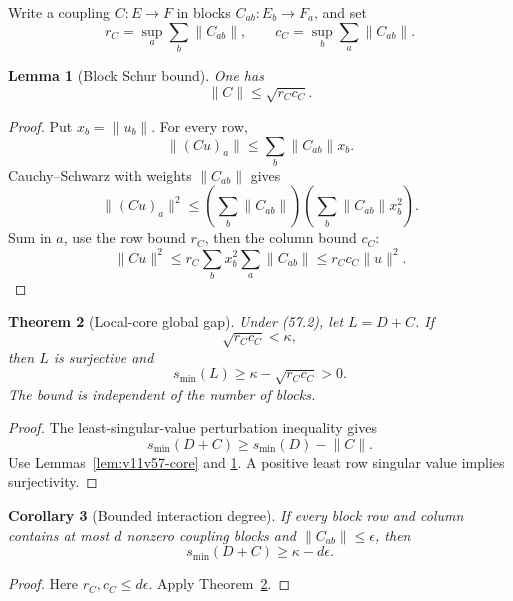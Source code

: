 \documentclass[11pt]{article}
\newtheorem{theorem}{Theorem}[section]
\newtheorem{lemma}[theorem]{Lemma}
\newtheorem{corollary}[theorem]{Corollary}
\begin{document}
Write a coupling \(C:E\to F\) in blocks \(C_{ab}:E_b\to F_a\), and set
\[
 r_C=\sup_a\sum_b\lVert C_{ab}\rVert,\qquad
 c_C=\sup_b\sum_a\lVert C_{ab}\rVert.                         \tag{57.4}
\]

\begin{lemma}[Block Schur bound]
\label{lem:v11v57-schur}
One has
\[
                              \lVert C\rVert\le\sqrt{r_Cc_C}. \tag{57.5}
\]
\end{lemma}

\begin{proof}
Put \(x_b=\lVert u_b\rVert\).  For every row,
\[
 \lVert(Cu)_a\rVert
 \le\sum_b\lVert C_{ab}\rVert x_b.
\]
Cauchy--Schwarz with weights \(\lVert C_{ab}\rVert\) gives
\[
 \lVert(Cu)_a\rVert^2
 \le\left(\sum_b\lVert C_{ab}\rVert\right)
     \left(\sum_b\lVert C_{ab}\rVert x_b^2\right).
\]
Sum in \(a\), use the row bound \(r_C\), then the column bound \(c_C\):
\[
 \lVert Cu\rVert^2
 \le r_C\sum_bx_b^2\sum_a\lVert C_{ab}\rVert
 \le r_Cc_C\lVert u\rVert^2.
\]
\end{proof}

\begin{theorem}[Local-core global gap]
\label{thm:v11v57-global-gap}
Under (57.2), let \(L=D+C\).  If
\[
                              \sqrt{r_Cc_C}<\kappa,            \tag{57.6}
\]
then \(L\) is surjective and
\[
                     s_{\min}(L)
                       \ge\kappa-\sqrt{r_Cc_C}>0.             \tag{57.7}
\]
The bound is independent of the number of blocks.
\end{theorem}

\begin{proof}
The least-singular-value perturbation inequality gives
\[
                       s_{\min}(D+C)
                       \ge s_{\min}(D)-\lVert C\rVert.
\]
Use Lemmas~\ref{lem:v11v57-core} and
\ref{lem:v11v57-schur}.  A positive least row singular value implies
surjectivity.
\end{proof}

\begin{corollary}[Bounded interaction degree]
\label{cor:v11v57-degree}
If every block row and column contains at most \(d\) nonzero coupling
blocks and \(\lVert C_{ab}\rVert\le\epsilon\), then
\[
                       s_{\min}(D+C)\ge\kappa-d\epsilon.       \tag{57.8}
\]
\end{corollary}

\begin{proof}
Here \(r_C,c_C\le d\epsilon\).  Apply
Theorem~\ref{thm:v11v57-global-gap}.
\end{proof}
\end{document}
